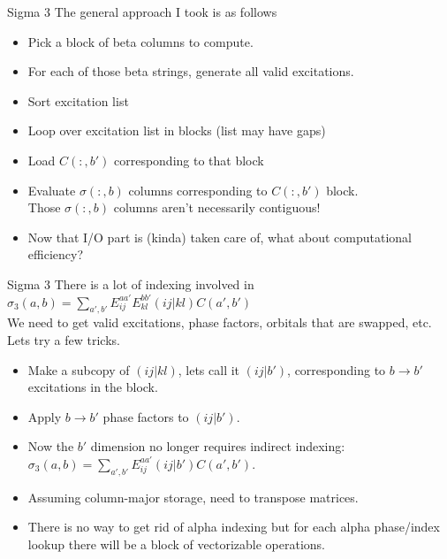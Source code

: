 \documentclass{beamer}
\begin{document}
\begin{frame}[fragile]{Sigma 3}
 The general approach I took is as follows
\begin{itemize}
\item Pick a block of beta columns to compute.
\item For each of those beta strings, generate all valid excitations.
\item Sort excitation list
\item Loop over excitation list in blocks (list may have gaps)
\item Load $C(:,b')$ corresponding to that block
\item Evaluate $\sigma(:,b)$ columns corresponding to $C(:,b')$ block. \\
  Those $\sigma(:,b)$ columns aren't necessarily contiguous!
\item Now that I/O part is (kinda) taken care of, what about computational efficiency?
\end{itemize}
\end{frame}

\begin{frame}[fragile]{Sigma 3}
  There is a lot of indexing involved in 
  $\sigma_3(a,b) = \sum_{a',b'} E_{ij}^{aa'} E_{kl}^{bb'} (ij|kl) C(a',b')$ \\
  We need to get valid excitations, phase factors, orbitals that are swapped, etc.
  Lets try a few tricks.
\begin{itemize}
\item Make a subcopy of $(ij|kl)$, lets call it $(ij|b')$, corresponding to
  $b \rightarrow b'$ excitations in the block.
\item Apply $b \rightarrow b'$ phase factors to $(ij|b')$.
\item Now the $b'$ dimension no longer requires indirect indexing: \\
  $\sigma_3(a,b) = \sum_{a',b'} E_{ij}^{aa'} (ij|b') C(a',b')$.
\item Assuming column-major storage, need to transpose matrices.
\item There is no way to get rid of alpha indexing but
  for each alpha phase/index lookup there will be a block of vectorizable operations.
\end{itemize}
\end{frame}
\end{document}
